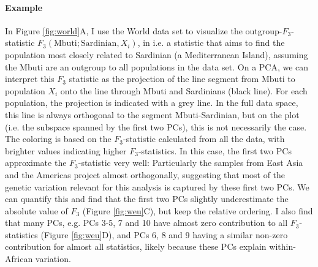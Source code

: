 \documentclass[12pt,fullpage, a4paper]{article}
\begin{document}
 
 




\paragraph{Example}
In Figure \ref{fig:world}A, I use the World data set to visualize the outgroup-$F_3$-statistic $F_3(\text{Mbuti}; \text{Sardinian}, X_i)$, in i.e. a statistic that aims to find the population most closely related to Sardinian (a Mediterranean Island), assuming the Mbuti are an outgroup to all populations in the data set. On a PCA, we can interpret this $F_3$ statistic as the projection of the line segment from $\text{Mbuti}$ to population $X_i$ onto the line through Mbuti and Sardinians (black line). For each population, the projection is indicated with a grey line. In the full data space, this line is always orthogonal to the segment Mbuti-Sardinian, but on the plot (i.e. the subspace spanned by the first two PCs), this is not necessarily the case.  The coloring is based on the $F_3$-statistic calculated from all the data, with brighter values indicating higher $F_3$-statistics. In this case, the first two PCs approximate the $F_3$-statistic very well: Particularly the samples from East Asia and the Americas  project almost orthogonally, suggesting that most of the genetic variation relevant for this analysis is captured by these first two PCs.  We can quantify this and find that the first two PCs slightly underestimate the absolute value of $F_3$ (Figure \ref{fig:weu}C), but keep the relative ordering. I also find that many PCs, e.g. PCs 3-5, 7 and 10 have almost zero contribution to all $F_3$-statistics (Figure \ref{fig:weu}D), and PCs 6, 8 and 9 having a similar non-zero contribution for almost all statistics, likely because these PCs explain within-African variation.
\end{document}
